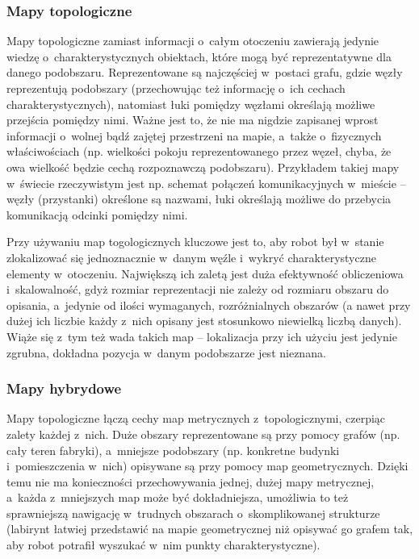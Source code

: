 \subsubsection{Mapy topologiczne}

Mapy topologiczne zamiast informacji o~całym otoczeniu zawierają jedynie wiedzę
o~charakterystycznych obiektach, które mogą być reprezentatywne dla danego podobszaru.
Reprezentowane są najczęściej w~postaci grafu, gdzie węzły reprezentują podobszary
(przechowując też informację o~ich cechach charakterystycznych), natomiast łuki
pomiędzy węzłami określają możliwe przejścia pomiędzy nimi. Ważne jest to, że nie
ma nigdzie zapisanej wprost informacji o~wolnej bądź zajętej przestrzeni na mapie,
a~także o~fizycznych właściwościach (np. wielkości pokoju reprezentowanego przez węzeł,
chyba, że owa wielkość będzie cechą rozpoznawczą podobszaru). Przykładem takiej mapy
w~świecie rzeczywistym jest np. schemat połączeń komunikacyjnych w~mieście -- węzły (przystanki)
określone są nazwami, łuki określają możliwe do przebycia komunikacją odcinki pomiędzy
nimi.

Przy używaniu map togologicznych kluczowe jest to, aby robot był w~stanie zlokalizować
się jednoznacznie w~danym węźle i~wykryć charakterystyczne elementy w~otoczeniu.
Największą ich zaletą jest duża efektywność obliczeniowa i~skalowalność, gdyż rozmiar
reprezentacji nie zależy od rozmiaru obszaru do opisania, a~jedynie od ilości wymaganych,
rozróżnialnych obszarów (a nawet przy dużej ich liczbie każdy z~nich opisany jest
stosunkowo niewielką liczbą danych). Wiąże się z~tym też wada takich map -- lokalizacja
przy ich użyciu jest jedynie zgrubna, dokładna pozycja w~danym podobszarze jest nieznana.

\subsubsection{Mapy hybrydowe}

Mapy topologiczne łączą cechy map metrycznych z~topologicznymi, czerpiąc zalety każdej z~nich.
Duże obszary reprezentowane są przy pomocy grafów (np. cały teren fabryki), a~mniejsze
podobszary (np. konkretne budynki i~pomieszczenia w~nich) opisywane są przy pomocy
map geometrycznych. Dzięki temu nie ma konieczności przechowywania jednej, dużej
mapy metrycznej, a~każda z~mniejszych map może być dokładniejsza, umożliwia to też
sprawniejszą nawigację w~trudnych obszarach o~skomplikowanej strukturze (labirynt
łatwiej przedstawić na mapie geometrycznej niż opisywać go grafem tak, aby robot potrafił
wyszukać w~nim punkty charakterystyczne).

